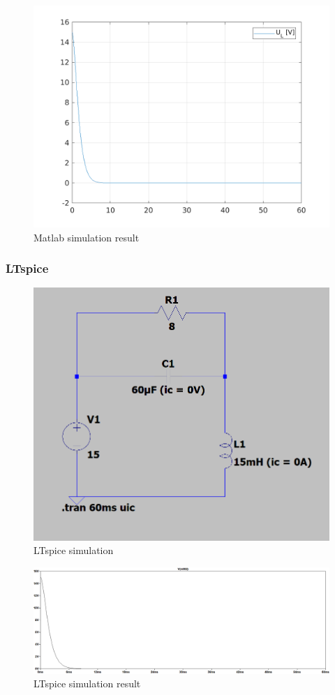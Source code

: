 \documentclass[a4paper]{article}
\begin{document}
\begin{figure}[h!]\centering
	\includegraphics[scale=0.7]{./../matlab/graph.png}
	\caption{Matlab simulation result}
\end{figure}
\pagebreak

\subsubsection{LTspice}

\begin{figure}[h!]\centering
	\includegraphics[scale=0.5]{./../LTspice/Assignment2.PNG}
	\caption{LTspice simulation}
\end{figure}

\begin{figure}[h!]\centering
	\includegraphics[scale=0.4]{./../LTspice/Assignment2_plot.png}
	\caption{LTspice simulation result}
\end{figure}
\end{document}
